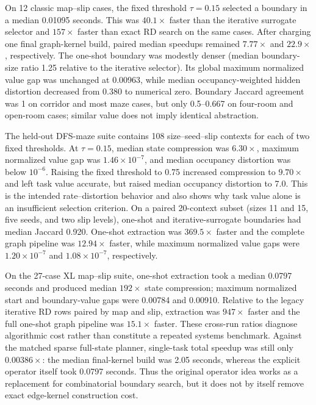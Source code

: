 \documentclass[10pt]{article}
\begin{document}
On 12 classic map--slip cases, the fixed threshold $\tau=0.15$ selected a
boundary in a median 0.01095 seconds. This was $40.1\times$ faster than the
iterative surrogate selector and $157\times$ faster than exact RD search on
the same cases. After charging one final graph-kernel build, paired median
speedups remained $7.77\times$ and $22.9\times$, respectively. The one-shot
boundary was modestly denser (median boundary-size ratio 1.25 relative to the
iterative selector). Its global maximum normalized value gap was unchanged at
0.00963, while median occupancy-weighted hidden distortion decreased from
0.380 to numerical zero. Boundary Jaccard agreement was 1 on corridor and most
maze cases, but only 0.5--0.667 on four-room and open-room cases; similar value
does not imply identical abstraction.

The held-out DFS-maze suite contains 108 size--seed--slip contexts for each of
two fixed thresholds. At $\tau=0.15$, median state compression was $6.30\times$,
maximum normalized value gap was $1.46\times10^{-7}$, and median occupancy
distortion was below $10^{-6}$. Raising the fixed threshold to 0.75 increased
compression to $9.70\times$ and left task value accurate, but raised median
occupancy distortion to 7.0. This is the intended rate--distortion behavior and
also shows why task value alone is an insufficient selection criterion.
On a paired 20-context subset (sizes 11 and 15, five seeds, and two slip
levels), one-shot and iterative-surrogate boundaries had median Jaccard 0.920.
One-shot extraction was $369.5\times$ faster and the complete graph pipeline
was $12.94\times$ faster, while maximum normalized value gaps were
$1.20\times10^{-7}$ and $1.08\times10^{-7}$, respectively.

On the 27-case XL map--slip suite, one-shot extraction took a median 0.0797
seconds and produced median $192\times$ state compression; maximum normalized
start and boundary-value gaps were 0.00784 and 0.00910. Relative to the legacy
iterative RD rows paired by map and slip, extraction was $947\times$ faster and
the full one-shot graph pipeline was $15.1\times$ faster. These cross-run ratios
diagnose algorithmic cost rather than constitute a repeated systems benchmark.
Against the matched sparse full-state planner, single-task total speedup was
still only $0.00386\times$: the median final-kernel build was 2.05 seconds,
whereas the explicit operator itself took 0.0797 seconds. Thus the original
operator idea works as a replacement for combinatorial boundary search, but it
does not by itself remove exact edge-kernel construction cost.
\end{document}
